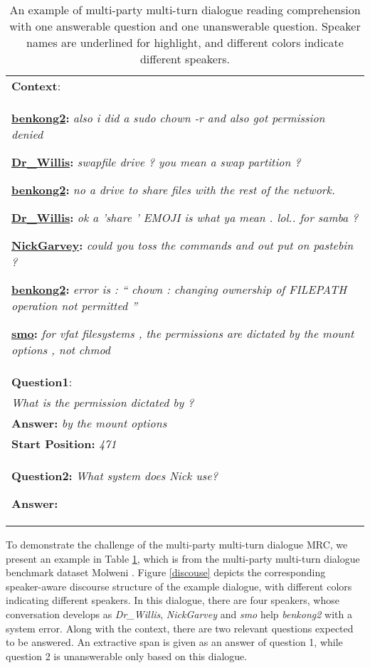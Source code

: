 \documentclass[letterpaper]{article} \usepackage{stylefile}  \usepackage{times}  \usepackage{helvet}  \usepackage{courier}  \usepackage[hyphens]{url}  \usepackage{graphicx} \urlstyle{rm} \def\UrlFont{\rm}  \usepackage{natbib}  \usepackage{caption} \DeclareCaptionStyle{ruled}{labelfont=normalfont,labelsep=colon,strut=off} \frenchspacing  \setlength{\pdfpagewidth}{8.5in}  \setlength{\pdfpageheight}{11in}  \usepackage{algorithm}
\begin{document}
	\begin{table}[t]
		\begin{center}\small
\begin{tabular}{|p{7.25cm}|}
\hline
\textbf{Context}: \\ 
				\textup{\textcolor[RGB]{16,83,154}{\textbf{\underline{benkong2}:} \textit{also i did a sudo chown -r and also got permission denied}} }
				
				\textup{\textcolor[RGB]{173,48,41}{\textbf{\underline{Dr\_Willis}:} \textit{swapfile drive ? you mean a swap partition ?}}}
				
				\textup{\textcolor[RGB]{16,83,154}{\textbf{\underline{benkong2}:} \textit{no a drive to share files with the rest of the network.} }}
			
				\textup{\textcolor[RGB]{173,48,41}{\textbf{\underline{Dr\_Willis}:} \textit{ok a 'share ' EMOJI is what ya mean . lol.. for samba ?}}}
			
				\textup{\textcolor[RGB]{11,138,17}{\textbf{\underline{NickGarvey}:} \textit{could you toss the commands and out put on pastebin ?}}} 
				
				\textup{\textcolor[RGB]{16,83,154}{\textbf{\underline{benkong2}:} \textit{error is : `` chown : changing ownership of FILEPATH operation not permitted ''}}}
			
				\textup{\textcolor[RGB]{227,109,38}{\textbf{\underline{smo}:} \textit{for vfat filesystems , the permissions are dictated by the mount options , not chmod}}}\\ 
				\hline
\textbf{Question1}: \\
				\textit{What is the permission dictated by ?}\\   
				\textbf{Answer:}
				\textit{by the mount options}\\
				\textbf{Start Position:}
				\textit{471}\\
				\hline
				\textbf{Question2:}
				\textit{What system does Nick use?}
				
				\textbf{Answer:}  \\
				\hline
\end{tabular}
		\end{center}
		\caption{\label{table1} An example of multi-party multi-turn dialogue reading comprehension with one answerable question and one unanswerable question. Speaker names are underlined for highlight, and different colors indicate different speakers.}
	\end{table}

To demonstrate the challenge of the multi-party multi-turn dialogue MRC, we present an example in Table \ref{table1}, which is from the multi-party multi-turn dialogue benchmark dataset Molweni \cite{li2020molweni}. Figure \ref{discouse} depicts the corresponding speaker-aware discourse structure of the example dialogue, with different colors indicating different speakers. In this dialogue, there are four speakers, whose conversation develops as \emph{Dr\_Willis}, \emph{NickGarvey} and \emph{smo} help \emph{benkong2} with a system error. Along with the context, there are two relevant questions expected to be answered. An extractive span is given as an answer of question 1, while question 2 is unanswerable only based on this dialogue.
	
\end{document}
